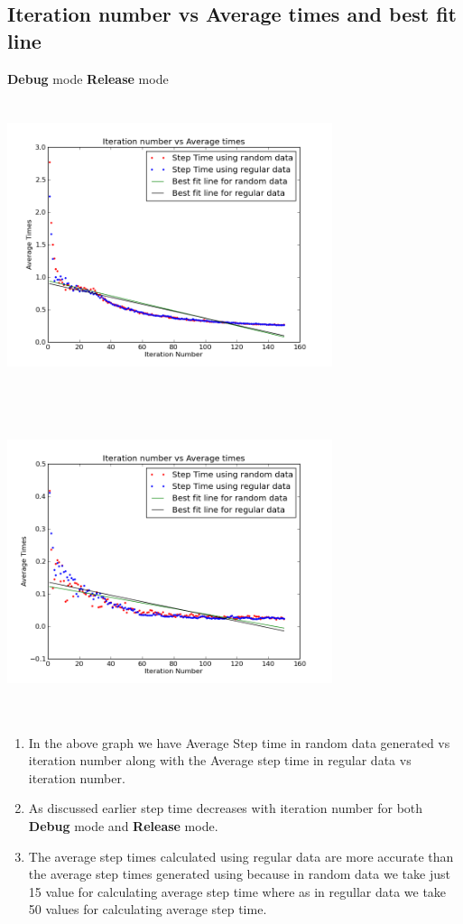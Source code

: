 \documentclass{article}
\begin{document}
\subsection{Iteration number vs Average times and best fit line}
\textbf{Debug} mode \hfill \textbf{Release} mode\\
\includegraphics[width=270pt,height=260pt]{g27_lab09_plot05_debug} \hfill  
\includegraphics[width=270pt,height=260pt]{g27_lab09_plot05_release}

\begin{enumerate}
\item In the above graph we have Average Step time in random data generated vs iteration number along with the Average step time in regular data vs iteration number.\\
\item As discussed earlier step time decreases with iteration number for both \textbf{Debug} mode and \textbf{Release} mode.
\item The average step times calculated using regular data are more accurate than the average step times generated using because in random data we take just 15 value for calculating average step time where as in regullar data we take 50 values for calculating average step time.
\end{enumerate}
\end{document}
